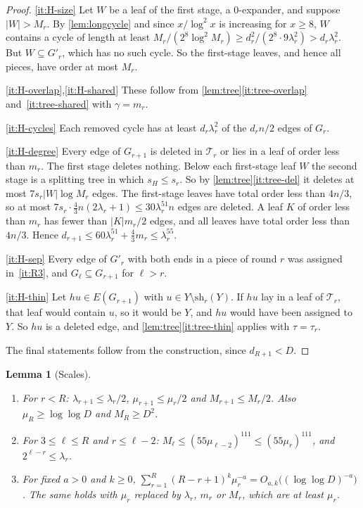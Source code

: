 \documentclass[11pt]{article}
\newtheorem{lemma}[theorem]{Lemma}
\theoremstyle{definition}
\theoremstyle{remark}
\numberwithin{equation}{section}
\numberwithin{figure}{section}
\numberwithin{table}{section}
\newcommand{\cT}{\mathcal{T}}
\newcommand{\sh}{\mathrm{sh}}
\begin{document}
\begin{proof}
\ref{it:H-size} Let $W$ be a leaf of the first stage, a $0$-expander, and
suppose $|W|>M_r$. By \cref{lem:longcycle} and since $x/\log^2x$ is increasing
for $x\ge8$, $W$ contains a cycle of length at least
$M_r/(2^8\log^2M_r)\ge d_r^2/(2^{8}\cdot9\lambda_r^2)>d_r\lambda_r^2$. But
$W\subseteq G'_r$, which has no such cycle. So the first-stage leaves, and
hence all pieces, have order at most $M_r$.

\ref{it:H-overlap},\ref{it:H-shared} These follow from
\cref{lem:tree}\ref{it:tree-overlap} and~\ref{it:tree-shared} with
$\gamma=m_r$.

\ref{it:H-cycles} Each removed cycle has at least $d_r\lambda_r^2$ of the
$d_rn/2$ edges of $G_r$.

\ref{it:H-degree} Every edge of $G_{r+1}$ is deleted in $\cT_r$ or lies in a
leaf of order less than $m_r$. The first stage deletes nothing. Below each
first-stage leaf $W$ the second stage is a splitting tree in which
$s_H\le s_r$. So by \cref{lem:tree}\ref{it:tree-del} it deletes at most
$7s_r|W|\log M_r$ edges. The first-stage leaves have total order less than
$4n/3$, so at most $7s_r\cdot\frac43n(2\lambda_r+1)\le30\lambda_r^{51}n$ edges
are deleted. A leaf $K$ of order less than $m_r$ has fewer than $|K|m_r/2$
edges, and all leaves have total order less than $4n/3$. Hence
$d_{r+1}\le60\lambda_r^{51}+\frac43m_r\le\lambda_r^{55}$.

\ref{it:H-sep} Every edge of $G'_r$ with both ends in a piece of round $r$ was
assigned in~\ref{it:R3}, and $G_\ell\subseteq G_{r+1}$ for $\ell>r$.

\ref{it:H-thin} Let $hu\in E(G_{r+1})$ with $u\in Y\setminus\sh_r(Y)$. If $hu$
lay in a leaf of $\cT_r$, that leaf would contain $u$, so it would be $Y$, and
$hu$ would have been assigned to $Y$. So $hu$ is a deleted edge, and
\cref{lem:tree}\ref{it:tree-thin} applies with $\tau=\tau_r$.

The final statements follow from the construction, since $d_{R+1}<D$.
\end{proof}

\begin{lemma}[Scales]\label{lem:scales}
\begin{enumerate}[label=\textup{(\alph*)},itemsep=1pt]
\item\label{it:sc-halve} For $r<R$: $\lambda_{r+1}\le\lambda_r/2$,
$\mu_{r+1}\le\mu_r/2$ and $M_{r+1}\le M_r/2$. Also $\mu_R\ge\log\log D$ and
$M_R\ge D^2$.
\item\label{it:sc-two} For $3\le\ell\le R$ and $r\le\ell-2$:
$M_\ell\le(55\mu_{\ell-2})^{111}\le(55\mu_r)^{111}$, and $2^{\ell-r}\le\lambda_r$.
\item\label{it:sc-sum} For fixed $a>0$ and $k\ge0$,
$\sum_{r=1}^R(R-r+1)^k\mu_r^{-a}=O_{a,k}\bigl((\log\log D)^{-a}\bigr)$. The same
holds with $\mu_r$ replaced by $\lambda_r$, $m_r$ or $M_r$, which are at least
$\mu_r$.
\end{enumerate}
\end{lemma}
\end{document}
